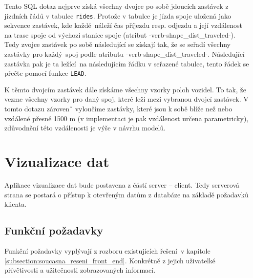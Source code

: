 Tento SQL dotaz nejprve získá všechny dvojce po sobě jdoucích zastávek z jízdních řádů v tabulce \verb-rides-. Protože v tabulce je jízda spoje uložená jako sekvence zastávek, kde každé náleží čas příjezdu resp. odjezdu a její vzdálenost na trase spoje od výchozí stanice spoje (atribut -verb-shape_dist_traveled-). Tedy zvojce zastávek po sobě následující se získají tak, že se seřadí všechny zastávky pro každý spoj podle atributu -verb-shape_dist_traveled-. Následující zastávka pak je ta ležící na následujícím řádku v seřazené tabulce, tento řádek se přečte pomocí funkce \verb-LEAD-.

\bigbreak

K těmto dvojcím zastávek dále získáme všechny vzorky poloh vozidel. To tak, že vezme všechny vzorky pro daný spoj, které leží mezi vybranou dvojcí zastávek. V tomto dotazu zárovenˇ vyloučíme zastávky, které jsou k sobě blíže než nebo vzdálené přesně 1500 m (v implementaci je pak vzdálenost určena parametricky), zdůvodnění této vzdálenosti je výše v návrhu modelů.




\section{Vizualizace dat}

 Aplikace vizualizace dat bude postavena z částí server -- client. Tedy serverová strana se postará o přístup k otevřeným datům z databáze na základě požadavků klienta.

\subsection{Funkční požadavky}

Funkční požadavky vyplývají z rozboru existujících řešení v kapitole \ref{subsection:soucasna_reseni_front_end}. Konkrétně z jejich uživatelké přívětivosti a užitečnosti zobrazovaných informací.

